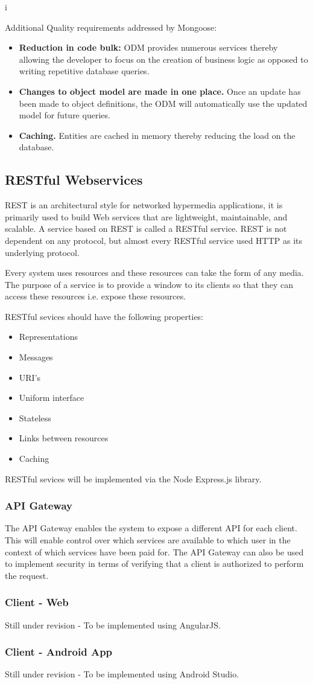 i\documentclass[a4paper,12pt]{article}
\begin{document}
	{\noindent}Additional Quality requirements addressed by Mongoose:
	\begin{itemize}
		\item \textbf{Reduction in code bulk:} ODM provides numerous services thereby allowing the developer to focus on the creation of business logic as opposed to writing repetitive database queries. 
		\item \textbf{Changes to object model are made in one place.} Once an update has been made to object definitions, the ODM will automatically use the updated model for future queries. 
		\item \textbf{Caching.} Entities are cached in memory thereby reducing the load on the database. 
	\end{itemize}
	
	\newpage
	\subsection{RESTful Webservices}
	REST is an architectural style for networked hypermedia applications, it is primarily used to build Web services that are lightweight, maintainable, and scalable. A service based on REST is called a RESTful service. REST is not dependent on any protocol, but almost every RESTful service used HTTP as its underlying protocol.
	
	\noindent Every system uses resources and these resources can take the form of any media. The purpose of a service is to provide a window to its clients so that they can access these resources i.e. expose these resources.
	
	\noindent RESTful sevices should have the following properties:
	
	\begin{itemize}
		\item Representations
		\item Messages
		\item URI's
		\item Uniform interface
		\item Stateless
		\item Links between resources
		\item Caching
	\end{itemize}
	
	\noindent RESTful sevices will be implemented via the Node Express.js library.
	
	\subsubsection{API Gateway}
	The API Gateway enables the system to expose a different API for each client. This will enable control over which services are available to which user in the context of which services have been paid for. The API Gateway can also be used to implement security in terms of verifying that a client is authorized to perform the request.
	
	\subsubsection{Client - Web}
	Still under revision - To be implemented using AngularJS.
	\subsubsection{{Client - Android App}}
	Still under revision - To be implemented using Android Studio.
\end{document}
